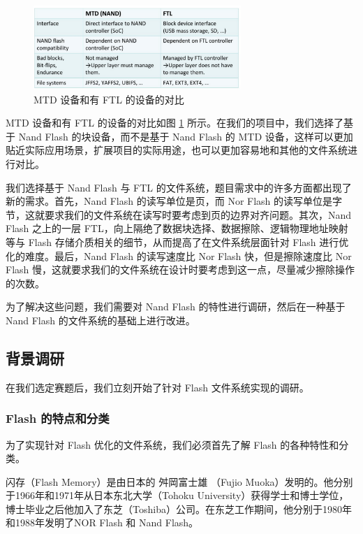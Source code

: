 \begin{figure}[htbp]
  \centering
  \includegraphics[width=0.7\textwidth]{fig/flash-mtd-ftl}
  \caption{MTD 设备和有 FTL 的设备的对比}
  \label{flash-mtd-ftl}
\end{figure}

MTD 设备和有 FTL 的设备的对比如图 \ref{flash-mtd-ftl} 所示。在我们的项目中，我们选择了基于 Nand Flash 的块设备，而不是基于 Nand Flash 的 MTD 设备，这样可以更加贴近实际应用场景，扩展项目的实际用途，也可以更加容易地和其他的文件系统进行对比。

我们选择基于 Nand Flash 与 FTL 的文件系统，题目需求中的许多方面都出现了新的需求。首先，Nand Flash 的读写单位是页，而 Nor Flash 的读写单位是字节，这就要求我们的文件系统在读写时要考虑到页的边界对齐问题。其次，Nand Flash 之上的一层 FTL，向上隔绝了数据块选择、数据擦除、逻辑物理地址映射等与 Flash 存储介质相关的细节，从而提高了在文件系统层面针对 Flash 进行优化的难度。最后，Nand Flash 的读写速度比 Nor Flash 快，但是擦除速度比 Nor Flash 慢，这就要求我们的文件系统在设计时要考虑到这一点，尽量减少擦除操作的次数。

为了解决这些问题，我们需要对 Nand Flash 的特性进行调研，然后在一种基于 Nand Flash 的文件系统的基础上进行改进。

\subsection{背景调研}

在我们选定赛题后，我们立刻开始了针对 Flash 文件系统实现的调研。

\subsubsection{Flash 的特点和分类}

为了实现针对 Flash 优化的文件系统，我们必须首先了解 Flash 的各种特性和分类。

闪存（Flash Memory）是由日本的 舛岡富士雄 （Fujio Muoka）发明的。他分别于1966年和1971年从日本东北大学（Tohoku University）获得学士和博士学位，博士毕业之后他加入了东芝（Toshiba）公司。在东芝工作期间，他分别于1980年和1988年发明了NOR Flash 和 Nand Flash。

